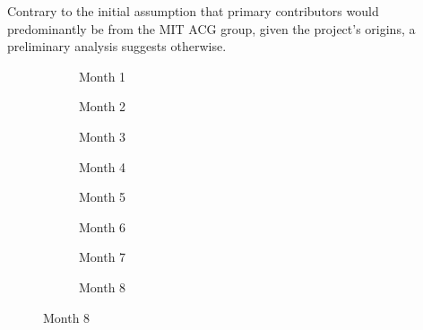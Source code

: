 

Contrary to the initial assumption that primary contributors would predominantly be from the MIT ACG group, given the project's origins, a preliminary analysis suggests otherwise.

\begin{figure}[htbp]
	\centering

	\begin{subfigure}[b]{0.24\textwidth}
		
		\caption{Month 1}
		\label{fig:month1}
	\end{subfigure}
	\hfill
	\begin{subfigure}[b]{0.24\textwidth}
		
		\caption{Month 2}
		\label{fig:month2}
	\end{subfigure}
	\hfill
	\begin{subfigure}[b]{0.24\textwidth}
		
		\caption{Month 3}
		\label{fig:month3}
	\end{subfigure}
	\hfill
	\begin{subfigure}[b]{0.24\textwidth}
		
		\caption{Month 4}
		\label{fig:month4}
	\end{subfigure}

	\vspace{0.25cm}

	\begin{subfigure}[b]{0.24\textwidth}
		
		\caption{Month 5}
		\label{fig:month5}
	\end{subfigure}
	\hfill
	\begin{subfigure}[b]{0.24\textwidth}
		
		\caption{Month 6}
		\label{fig:month6}
	\end{subfigure}
	\hfill
	\begin{subfigure}[b]{0.24\textwidth}
		
		\caption{Month 7}
		\label{fig:month 7}
	\end{subfigure}
	\hfill
	\begin{subfigure}[b]{0.24\textwidth}
		
		\caption{Month 8}
		\label{fig:month 8}
	\end{subfigure}


\end{figure}
